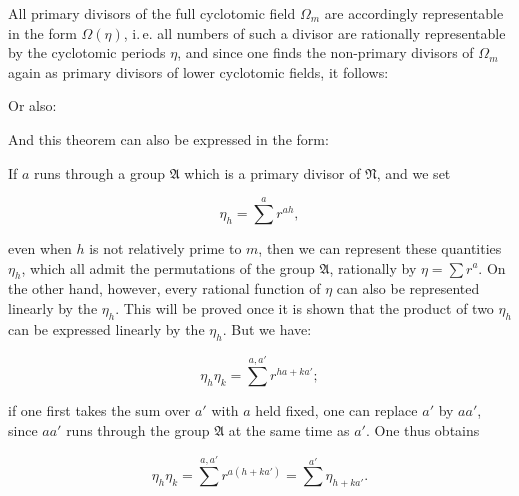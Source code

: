 
All primary divisors of the full cyclotomic field $\Omega_m$ are accordingly representable in the form $\Omega(\eta)$, i.\,e. all numbers of such a divisor are rationally representable by the cyclotomic periods $\eta$, and since one finds the non-primary divisors of $\Omega_m$ again as primary divisors of lower cyclotomic fields, it follows:


Or also:


And this theorem can also be expressed in the form:


If $a$ runs through a group $\mathfrak{A}$ which is a primary divisor of $\mathfrak{N}$, and we set

\[
\eta_h = \sum^a r^{ah},
\]

even when $h$ is not relatively prime to $m$, then we can represent these quantities $\eta_h$, which all admit the permutations of the group $\mathfrak{A}$, rationally by $\eta = \sum r^a$. On the other hand, however, every rational function of $\eta$ can also be represented linearly by the $\eta_h$. This will be proved once it is shown that the product of two $\eta_h$ can be expressed linearly by the $\eta_h$. But we have:

\[
\eta_h \eta_k = \sum^{a, a'} r^{ha + ka'};
\]

if one first takes the sum over $a'$ with $a$ held fixed, one can replace $a'$ by $aa'$, since $aa'$ runs through the group $\mathfrak{A}$ at the same time as $a'$. One thus obtains

\[
\eta_h \eta_k = \sum^{a, a'} r^{a(h + ka')} = \sum^{a'} \eta_{h + ka'}.
\]
